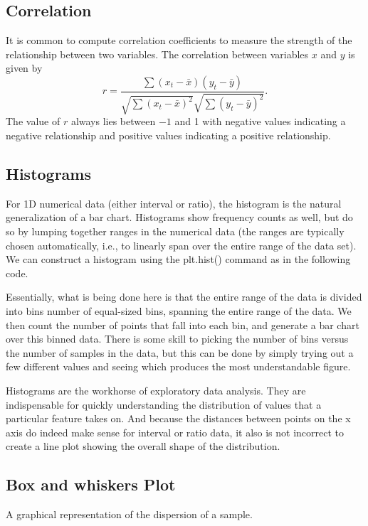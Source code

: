 \documentclass[openany]{book}
\begin{document}
\subsection{Correlation}

It is common to compute correlation coefficients to measure the strength of the relationship between two variables. The correlation between variables $x$ and $y$ is given by
$$
r=\frac{\sum\left(x_t-\bar{x}\right)\left(y_t-\bar{y}\right)}{\sqrt{\sum\left(x_t-\bar{x}\right)^2} \sqrt{\sum\left(y_t-\bar{y}\right)^2}} .
$$
The value of $r$ always lies between $-1$ and 1 with negative values indicating a negative relationship and positive values indicating a positive relationship. 

\subsection{Histograms}

For 1D numerical data (either interval or ratio), the histogram is the natural generalization of a bar chart. Histograms show frequency counts as well, but do so by lumping together ranges in the numerical data (the ranges are typically chosen automatically, i.e., to linearly span over the entire range of the data set). We can construct a histogram using the plt.hist() command as in the following code.

Essentially, what is being done here is that the entire range of the data is divided into bins number of equal-sized bins, spanning the entire range of the data. We then count the number of points that fall into each bin, and generate a bar chart over this binned data. There is some skill to picking the number of bins versus the number of samples in the data, but this can be done by simply trying out a few different values and seeing which produces the most understandable figure.

Histograms are the workhorse of exploratory data analysis. They are indispensable for quickly understanding the distribution of values that a particular feature takes on. And because the distances between points on the x axis do indeed make sense for interval or ratio data, it also is not incorrect to create a line plot showing the overall shape of the distribution.


\subsection{Box and whiskers Plot}

A graphical representation of the dispersion of a sample. 
\end{document}
